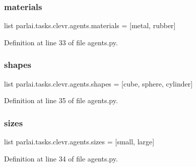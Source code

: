 \subsubsection{\texorpdfstring{materials}{materials}}
{\footnotesize\ttfamily list parlai.\+tasks.\+clevr.\+agents.\+materials = \mbox{[}\textquotesingle{}metal\textquotesingle{}, \textquotesingle{}rubber\textquotesingle{}\mbox{]}}



Definition at line 33 of file agents.\+py.

\mbox{\label{namespaceparlai_1_1tasks_1_1clevr_1_1agents_ac54e3cd91825301baef61b929e13c0b4}} 
\subsubsection{\texorpdfstring{shapes}{shapes}}
{\footnotesize\ttfamily list parlai.\+tasks.\+clevr.\+agents.\+shapes = \mbox{[}\textquotesingle{}cube\textquotesingle{}, \textquotesingle{}sphere\textquotesingle{}, \textquotesingle{}cylinder\textquotesingle{}\mbox{]}}



Definition at line 35 of file agents.\+py.

\mbox{\label{namespaceparlai_1_1tasks_1_1clevr_1_1agents_a565c7b5d57a9f93a062d7a130f6ba989}} 
\subsubsection{\texorpdfstring{sizes}{sizes}}
{\footnotesize\ttfamily list parlai.\+tasks.\+clevr.\+agents.\+sizes = \mbox{[}\textquotesingle{}small\textquotesingle{}, \textquotesingle{}large\textquotesingle{}\mbox{]}}



Definition at line 34 of file agents.\+py.

